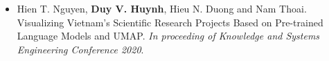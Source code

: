 






\begin{itemize}
	\item Hien T. Nguyen, \textbf{Duy V. Huynh}, Hieu N. Duong and Nam Thoai. Visualizing Vietnam’s Scientific Research Projects Based on Pre-trained Language Models and UMAP. \textit{In proceeding of Knowledge and Systems Engineering Conference 2020}.
\end{itemize}
